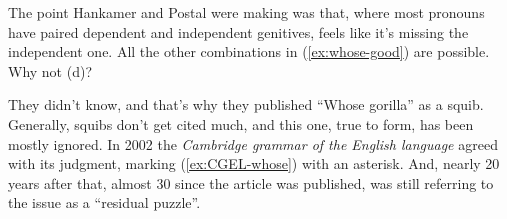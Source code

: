The point Hankamer and Postal were making was that, where most pronouns have paired dependent and independent genitives,  feels like it's missing the independent one. All the other combinations in (\ref{ex:whose-good}) are possible. Why not (d)?

\ea \label{ex:whose-good}
 \z
\z

They didn't know, and that's why they published \enquote{Whose gorilla} as a squib. Generally, squibs don't get cited much, and this one, true to form, has been mostly ignored. In 2002 the \textit{Cambridge grammar of the English language} agreed with its judgment, marking (\ref{ex:CGEL-whose}) with an asterisk. And, nearly 20 years after that, almost 30 since the article was published, \citet{Cinque2020a} was still referring to the issue as a \enquote{residual puzzle}.

\label{ex:CGEL-whose}
\z

\bigskip


